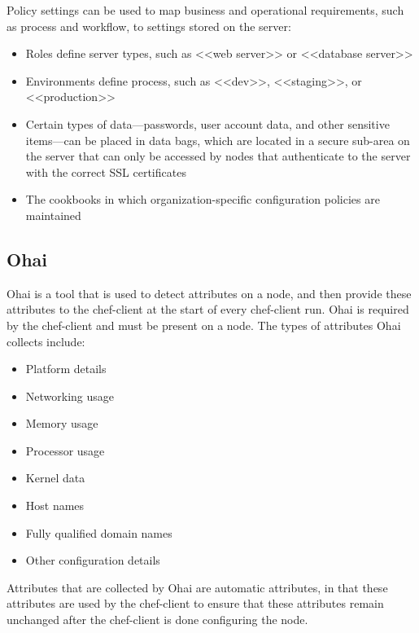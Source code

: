 Policy settings can be used to map business and operational requirements, such as process and workflow, to settings stored on the server:

\begin{itemize}
  \item Roles define server types, such as <<web server>> or <<database server>>
  \item Environments define process, such as <<dev>>, <<staging>>, or <<production>>
  \item Certain types of data—passwords, user account data, and other sensitive items—can be placed in data bags, which are located in a secure sub-area on the server that can only be accessed by nodes that authenticate to the server with the correct SSL certificates
  \item The cookbooks in which organization-specific configuration policies are maintained
\end{itemize}

\subsection{Ohai}

Ohai is a tool that is used to detect attributes on a node, and then provide these attributes to the chef-client at the start of every chef-client run. Ohai is required by the chef-client and must be present on a node. The types of attributes Ohai collects include:

\begin{itemize}
  \item Platform details
  \item Networking usage
  \item Memory usage
  \item Processor usage
  \item Kernel data
  \item Host names
  \item Fully qualified domain names
  \item Other configuration details
\end{itemize}

Attributes that are collected by Ohai are automatic attributes, in that these attributes are used by the chef-client to ensure that these attributes remain unchanged after the chef-client is done configuring the node.